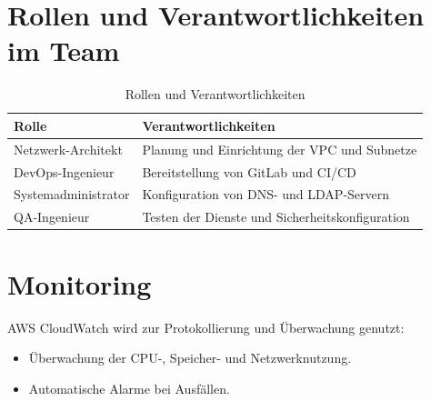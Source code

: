 \documentclass[a4paper,12pt]{article}
\begin{document}
\section{Rollen und Verantwortlichkeiten im Team}

\begin{table}[h!]
	\centering
	\begin{tabular}{|l|l|}
		\hline
		\textbf{Rolle}      & \textbf{Verantwortlichkeiten}                   \\ \hline
		Netzwerk-Architekt  & Planung und Einrichtung der VPC und Subnetze    \\ \hline
		DevOps-Ingenieur    & Bereitstellung von GitLab und CI/CD             \\ \hline
		Systemadministrator & Konfiguration von DNS- und LDAP-Servern         \\ \hline
		QA-Ingenieur        & Testen der Dienste und Sicherheitskonfiguration \\ \hline
	\end{tabular}
	\caption{Rollen und Verantwortlichkeiten}
\end{table}


\section{Monitoring}
AWS CloudWatch wird zur Protokollierung und Überwachung genutzt:
\begin{itemize}
	\item Überwachung der CPU-, Speicher- und Netzwerknutzung.
	\item Automatische Alarme bei Ausfällen.
\end{itemize}
\end{document}
